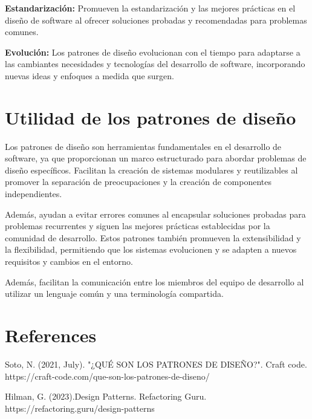 \documentclass{article}
\begin{document}
\begin{multicols}{2}
		\textbf{Estandarización:} Promueven la estandarización y las mejores prácticas en el diseño de software al ofrecer soluciones probadas y recomendadas para problemas comunes.
		
		\textbf{Evolución:} Los patrones de diseño evolucionan con el tiempo para adaptarse a las cambiantes necesidades y tecnologías del desarrollo de software, incorporando nuevas ideas y enfoques a medida que surgen.
		
		\section{Utilidad de los patrones de diseño}
		Los patrones de diseño son herramientas fundamentales en el desarrollo de software, ya que proporcionan un marco estructurado para abordar problemas de diseño específicos. Facilitan la creación de sistemas modulares y reutilizables al promover la separación de preocupaciones y la creación de componentes independientes. 
		
		Además, ayudan a evitar errores comunes al encapsular soluciones probadas para problemas recurrentes y siguen las mejores prácticas establecidas por la comunidad de desarrollo. Estos patrones también promueven la extensibilidad y la flexibilidad, permitiendo que los sistemas evolucionen y se adapten a nuevos requisitos y cambios en el entorno. 
		
		Además, facilitan la comunicación entre los miembros del equipo de desarrollo al utilizar un lenguaje común y una terminología compartida. 
		
	\end{multicols} 
	\section{References}
	
	Soto, N. (2021, July). "¿QUÉ SON LOS PATRONES DE DISEÑO?". Craft code. 
	https://craft-code.com/que-son-los-patrones-de-diseno/
	
	
	Hilman, G. (2023).Design Patterns. Refactoring Guru.
	https://refactoring.guru/design-patterns
	
\end{document}
